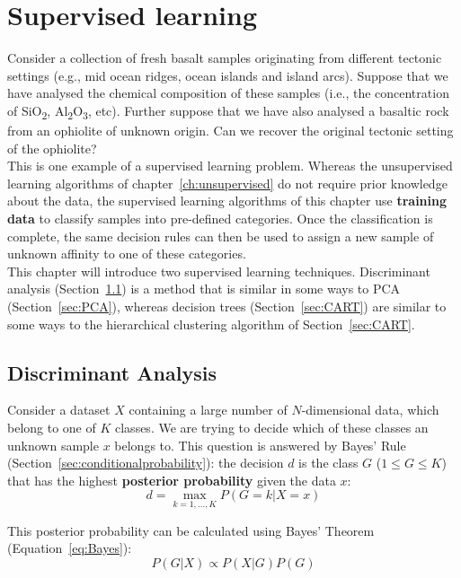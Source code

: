\chapter{Supervised learning}
\label{ch:supervised}

Consider a collection of fresh basalt samples originating from
different tectonic settings (e.g., mid ocean ridges, ocean islands and
island arcs).  Suppose that we have analysed the chemical composition
of these samples (i.e., the concentration of SiO\textsubscript{2},
Al\textsubscript{2}O\textsubscript{3}, etc). Further suppose that we
have also analysed a basaltic rock from an ophiolite of unknown
origin.  Can we recover the original tectonic setting of the
ophiolite?\\

This is one example of a supervised learning problem. Whereas the
unsupervised learning algorithms of chapter~\ref{ch:unsupervised} do
not require prior knowledge about the data, the supervised learning
algorithms of this chapter use \textbf{training data} to classify
samples into pre-defined categories. Once the classification is
complete, the same decision rules can then be used to assign a new
sample of unknown affinity to one of these categories.\\

This chapter will introduce two supervised learning techniques.
Discriminant analysis (Section~\ref{sec:LDA}) is a method that is
similar in some ways to PCA (Section~\ref{sec:PCA}), whereas decision
trees (Section~\ref{sec:CART}) are similar to some ways to the
hierarchical clustering algorithm of Section~\ref{sec:CART}.

\section{Discriminant Analysis}
\label{sec:LDA}

Consider a dataset $X$ containing a large number of $N$-dimensional
data, which belong to one of $K$ classes. We are trying to decide
which of these classes an unknown sample $x$ belongs to.  This
question is answered by Bayes' Rule
(Section~\ref{sec:conditionalprobability}): the decision $d$ is the
class $G$ ($1 \leq G \leq K$) that has the highest \textbf{posterior
  probability} given the data $x$:
\begin{equation}
  \label{eq:bayesRule}
  d = \underset{k=1,\ldots,K}{\max} P(G=k|X=x)
\end{equation}

This posterior probability can be calculated using Bayes' Theorem
(Equation~\ref{eq:Bayes}):
\begin{equation}
  \label{eq:bayesTheorem}
  P(G|X) \propto P(X|G)P(G)
\end{equation}

